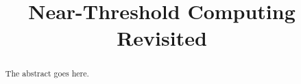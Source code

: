 \documentclass[conference]{IEEEtran}
\begin{document}
\title{Near-Threshold Computing Revisited}

\author{}

\maketitle


\begin{abstract}
The abstract goes here.
\end{abstract}














\end{document}
